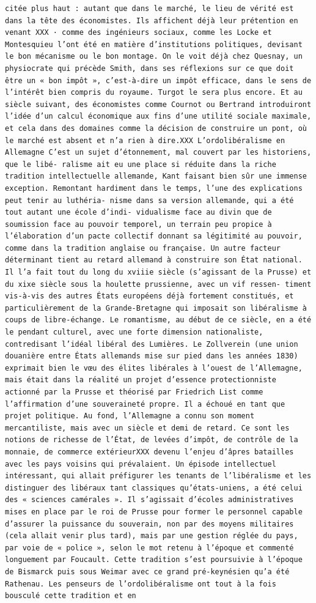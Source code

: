 \documentclass[
]{book}
\begin{document}
\begin{verbatim}
citée plus haut : autant que dans le marché, le lieu de vérité est dans la tête des économistes. Ils affichent déjà leur prétention en venant XXX · comme des ingénieurs sociaux, comme les Locke et Montesquieu l’ont été en matière d’institutions politiques, devisant le bon mécanisme ou le bon montage. On le voit déjà chez Quesnay, un physiocrate qui précède Smith, dans ses réflexions sur ce que doit être un « bon impôt », c’est-à-dire un impôt efficace, dans le sens de l’intérêt bien compris du royaume. Turgot le sera plus encore. Et au siècle suivant, des économistes comme Cournot ou Bertrand introduiront l’idée d’un calcul économique aux fins d’une utilité sociale maximale, et cela dans des domaines comme la décision de construire un pont, où le marché est absent et n’a rien à dire.XXX L’ordolibéralisme en Allemagne C’est un sujet d’étonnement, mal couvert par les historiens, que le libé- ralisme ait eu une place si réduite dans la riche tradition intellectuelle allemande, Kant faisant bien sûr une immense exception. Remontant hardiment dans le temps, l’une des explications peut tenir au luthéria- nisme dans sa version allemande, qui a été tout autant une école d’indi- vidualisme face au divin que de soumission face au pouvoir temporel, un terrain peu propice à l’élaboration d’un pacte collectif donnant sa légitimité au pouvoir, comme dans la tradition anglaise ou française. Un autre facteur déterminant tient au retard allemand à construire son État national. Il l’a fait tout du long du xviiie siècle (s’agissant de la Prusse) et du xixe siècle sous la houlette prussienne, avec un vif ressen- timent vis-à-vis des autres États européens déjà fortement constitués, et particulièrement de la Grande-Bretagne qui imposait son libéralisme à coups de libre-échange. Le romantisme, au début de ce siècle, en a été le pendant culturel, avec une forte dimension nationaliste, contredisant l’idéal libéral des Lumières. Le Zollverein (une union douanière entre États allemands mise sur pied dans les années 1830) exprimait bien le vœu des élites libérales à l’ouest de l’Allemagne, mais était dans la réalité un projet d’essence protectionniste actionné par la Prusse et théorisé par Friedrich List comme l’affirmation d’une souveraineté propre. Il a échoué en tant que projet politique. Au fond, l’Allemagne a connu son moment mercantiliste, mais avec un siècle et demi de retard. Ce sont les notions de richesse de l’État, de levées d’impôt, de contrôle de la monnaie, de commerce extérieurXXX devenu l’enjeu d’âpres batailles avec les pays voisins qui prévalaient. Un épisode intellectuel intéressant, qui allait préfigurer les tenants de l’libéralisme et les distinguer des libéraux tant classiques qu’états-uniens, a été celui des « sciences camérales ». Il s’agissait d’écoles administratives mises en place par le roi de Prusse pour former le personnel capable d’assurer la puissance du souverain, non par des moyens militaires (cela allait venir plus tard), mais par une gestion réglée du pays, par voie de « police », selon le mot retenu à l’époque et commenté longuement par Foucault. Cette tradition s’est poursuivie à l’époque de Bismarck puis sous Weimar avec ce grand pré-keynésien qu’a été Rathenau. Les penseurs de l’ordolibéralisme ont tout à la fois bousculé cette tradition et en 
\end{verbatim}
\end{document}
